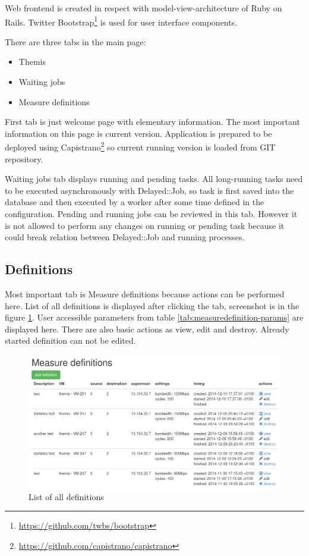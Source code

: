 Web frontend is created in respect with model-view-architecture of Ruby on Rails. Twitter Bootstrap\footnote{\url{https://github.com/twbs/bootstrap}} is used for user interface components.

There are three tabs in the main page:
	\begin{itemize}
		\item Themis
		\item Waiting jobs
		\item Measure definitions
	\end{itemize}

First tab is just welcome page with elementary information. The most important information on this page is current version. Application is prepared to be deployed using Capistrano\footnote{\url{https://github.com/capistrano/capistrano}} so current running version is loaded from GIT repository.

Waiting jobs tab displays running and pending tasks. All long-running tasks need to be executed asynchronously with Delayed::Job, so task is first saved into the database and then executed by a worker after some time defined in the configuration. Pending and running jobs can be reviewed in this tab. However it is not allowed to perform any changes on running or pending task because it could break relation between Delayed::Job and running processes.

\subsection{Definitions}
Most important tab is Measure definitions because actions can be performed here. List of all definitions is displayed after clicking the tab, screenshot is in the figure \ref{img:themis-definitions}. User accessible parameters from table \ref{tab:measuredefinition-params} are displayed here. There are also basic actions as view, edit and destroy. Already started definition can not be edited.

\begin{figure}[htb]
	\begin{center}
	\includegraphics[width=\textwidth]{themis-definitions.png}
	\end{center}
	\caption{List of all definitions}
	\label{img:themis-definitions}
\end{figure}

